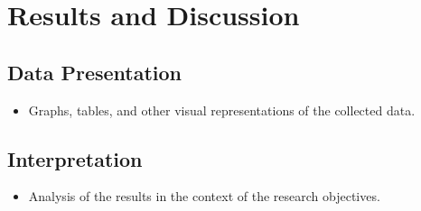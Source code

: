 \chapter{\rm\bfseries Results and Discussion}
\label{ch:results_and_discussion}

\section{Data Presentation}
\begin{itemize}
    \item Graphs, tables, and other visual representations of the collected data.
\end{itemize}

\section{Interpretation}
\begin{itemize}
    \item Analysis of the results in the context of the research objectives.
\end{itemize}


